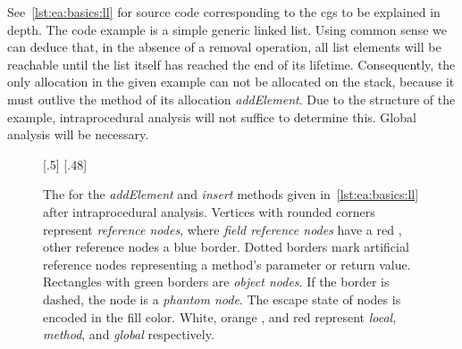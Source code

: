 			See~\cref{lst:ea:basics:ll} for source code corresponding to the \glspl{cg} to be explained in depth. The code
			example is a simple generic linked list. Using common sense we can deduce that, in the absence of a removal
			operation, all list elements will be reachable until the list itself has reached the end of its lifetime.
			Consequently, the only allocation in the given example can not be allocated on the stack, because it must outlive
			the method of its allocation \emph{addElement}. Due to the structure of the example, intraprocedural analysis will
			not suffice to determine this. Global analysis will be necessary.

			\begin{figure}
				\centering%
				[.5\textwidth]{%
						\centering%
				}%
				\hspace{\fill}%
				{%
						\centering%
				}%
				\caption[The  for \emph{addElement} and \emph{insert} after intraprocedural analysis]{%
					The  for the \emph{addElement} and \emph{insert} methods given in~\cref{lst:ea:basics:ll} after
					intraprocedural analysis. Vertices with rounded corners represent \emph{reference nodes}, where \emph{field
					reference nodes} have a red {\color{cgred}\blacksquare}, other reference nodes a blue
					{\color{cgblue}\blacksquare} border. Dotted borders mark artificial reference nodes representing a method's
					parameter or return value. Rectangles with green {\color{cggreen}\blacksquare} borders are \emph{object
					nodes}. If the border is dashed, the node is a \emph{phantom node}. The escape state of nodes is encoded in
					the fill color. White, orange {\color{cgorange}\blacksquare}, and red {\color{cgwarn}\blacksquare} represent
					\emph{local}, \emph{method}, and \emph{global} respectively.}%
				\label{fig:ea:basics:ll}%
			\end{figure}

